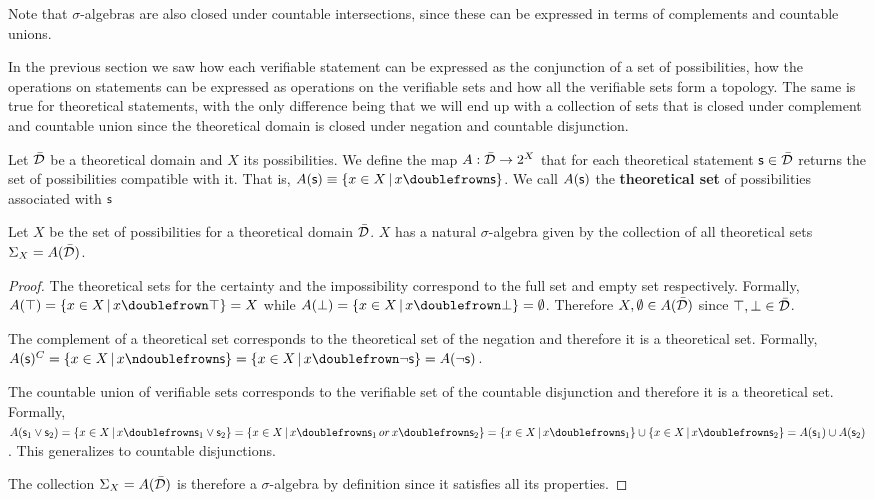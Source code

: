 \documentclass[11pt,letterpaper,fleqn]{memoir} %
\begin{document}
Note that $\sigma$-algebras are also closed under countable intersections, since these can be expressed in terms of complements and countable unions.

In the previous section we saw how each verifiable statement can be expressed as the conjunction of a set of possibilities, how the operations on statements can be expressed as operations on the verifiable sets and how all the verifiable sets form a topology. The same is true for theoretical statements, with the only difference being that we will end up with a collection of sets that is closed under complement and countable union since the theoretical domain is closed under negation and countable disjunction.

\begin{mathSection}
	
	\begin{defn}
		Let $\bar{\mathcal{D}}$ be a theoretical domain and $X$ its possibilities. We define the map $A : \bar{\mathcal{D}} \rightarrow 2^X$ that for each theoretical statement $\mathsf{s} \in \bar{\mathcal{D}}$ returns the set of possibilities compatible with it. That is, $A(\stmt)\equiv\{ x \in X \, | \, x \comp \stmt\}$. We call $A(\mathsf{s})$ the \textbf{theoretical set} of possibilities associated with $\mathsf{s}$
	\end{defn}
	
	\begin{prop}
		Let $X$ be the set of possibilities for a theoretical domain $\bar{\mathcal{D}}$. $X$ has a natural $\sigma$-algebra given by the collection of all theoretical sets $\Sigma_X=A(\bar{\mathcal{D}})$.
	\end{prop}
	
	\begin{proof}
	The theoretical sets for the certainty and the impossibility correspond to the full set and empty set respectively. Formally, $A(\certainty) = \{ x \in X \, | \, x \comp \certainty\} = X$ while $A(\impossibility) = \{ x \in X \, | \, x \comp \impossibility\} = \emptyset$. Therefore $X, \emptyset \in A(\bar{\mathcal{D}})$ since $\top, \bot \in \bar{\mathcal{D}}$.

	The complement of a theoretical set corresponds to the theoretical set of the negation and therefore it is a theoretical set. Formally, $A(\stmt)^C = \{ x \in X \, | \, x \ncomp \stmt\} =  \{ x \in X \, | \, x \comp \NOT\stmt\} = A(\NOT\stmt)$.

	The countable union of verifiable sets corresponds to the verifiable set of the countable disjunction and therefore it is a theoretical set. Formally, $A(\stmt_1\OR\stmt_2) = \{ x \in X \, | \, x \comp \stmt_1\OR\stmt_2\} =  \{ x \in X \, | \, x \comp \stmt_1 \, or \, x \comp \stmt_2\} = \{ x \in X \, | \, x \comp \stmt_1\} \cup \{ x \in X \, | \, x \comp \stmt_2\} = A(\stmt_1) \cup A(\stmt_2)$. This generalizes to countable disjunctions.

	The collection $\Sigma_X=A(\bar{\mathcal{D}})$ is therefore a $\sigma$-algebra by definition since it satisfies all its properties.
	\end{proof}
\end{mathSection}
\end{document}
